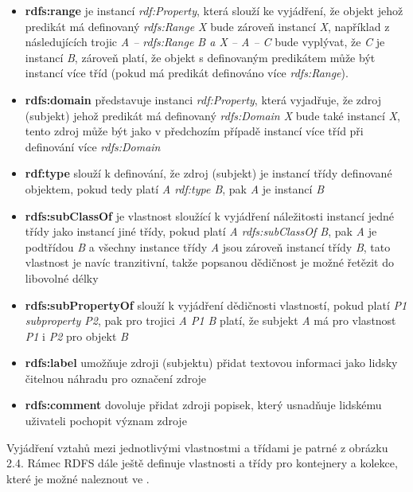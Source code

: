 \documentclass{projekt}
\begin{document}
\begin {itemize}


\item \textbf{rdfs:range} je instancí {\it rdf:Property}, která slouží ke vyjádření, že objekt jehož predikát má definovaný {\it  rdfs:Range X} bude zároveň instancí {\it X}, například z následujících trojic {\it A – rdfs:Range B a X – A – C} bude vyplývat, že {\it C} je instancí {\it B}, 
zároveň platí, že objekt s definovaným predikátem může být instancí více tříd (pokud má predikát definováno více {\it  rdfs:Range}).

\item \textbf{rdfs:domain} představuje instanci {\it rdf:Property}, která vyjadřuje, že zdroj (subjekt) jehož predikát má definovaný {\it rdfs:Domain X} bude také instancí {\it X}, tento zdroj může být jako v předchozím případě instancí více tříd při definování více {\it rdfs:Domain}
\item \textbf{rdf:type} slouží k definování, že zdroj (subjekt) je instancí třídy definované objektem, pokud tedy platí {\it A rdf:type B}, pak {\it A} je instancí {\it B}
\item \textbf{rdfs:subClassOf} je vlastnost sloužící k vyjádření náležitosti instancí jedné třídy jako instancí jiné třídy, pokud platí {\it A rdfs:subClassOf B}, pak {\it A} je podtřídou {\it B} a všechny instance třídy {\it A} jsou zároveň instancí třídy {\it B}, tato vlastnost je navíc tranzitivní, takže popsanou dědičnost je možné řetězit do libovolné délky
\item \textbf{rdfs:subPropertyOf} slouží k vyjádření dědičnosti vlastností, pokud platí {\it P1 subproperty P2}, pak pro trojici {\it A P1 B} platí, že subjekt {\it A} má pro vlastnost {\it P1} i {\it P2} pro objekt {\it B}
\item \textbf{rdfs:label} umožňuje zdroji (subjektu) přidat textovou informaci jako lidsky čitelnou náhradu pro označení zdroje
\item \textbf{rdfs:comment} dovoluje přidat zdroji popisek, který usnadňuje lidskému uživateli pochopit význam zdroje \cite{_7}

\end{itemize}

Vyjádření vztahů mezi jednotlivými vlastnostmi a třídami je patrné z obrázku 2.4. Rámec RDFS dále ještě definuje vlastnosti a třídy pro kontejnery a kolekce, které je možné naleznout ve \cite{_7}.
\end{document}
